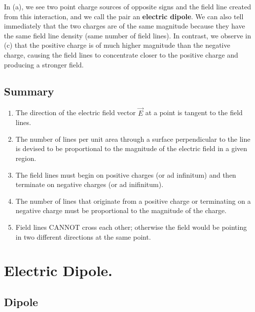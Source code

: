 \documentclass[11pt, letterpaper]{article}
\begin{document}
	In (a), we see two point charge sources of opposite signs and the field line created from this 
	interaction, and we call the pair an \textbf{electric dipole}. We can also tell immediately that 
	the two charges are of the same magnitude because they have the same field line density 
	(same number of field lines). In contrast, we observe in (c) that the positive charge is of 
	much higher magnitude than the negative charge, causing the field lines to concentrate 
	closer to the positive charge and producing a stronger field. 
	
	\subsection{Summary}
	\renewcommand{\theenumi}{\Roman{enumi}}
	\begin{enumerate}
		\item The direction of the electric field vector $\vec{E}$ at a point is tangent to the field lines. 
		\item The number of lines per unit area through a surface perpendicular to the line is 
				 devised to be proportional to the magnitude of the electric field in a given region. 
		\item The field lines must begin on positive charges (or ad infinitum) and then terminate on
				 negative charges (or ad inifinitum). 
		\item The number of lines that originate from a positive charge or terminating on a negative
				 charge must be proportional to the magnitude of the charge.
		\item Field lines CANNOT cross each other; otherwise the field would be pointing in two
				 different directions at the same point.
	\end{enumerate}
	
\section{Electric Dipole.}
	
	\subsection{Dipole}
	
\end{document}
